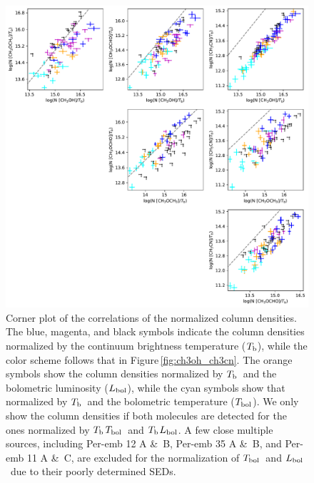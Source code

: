 \documentclass[twocolumn]{aastex62}
\newcommand{\lbol}{\mbox{$L_{\rm bol}$}}
\newcommand{\tbol}{\mbox{$T_{\rm bol}$}}
\newcommand{\tb}{\mbox{$T_{\rm b}$}}
\begin{document}
\begin{figure}[htbp!]
  \centering
  \includegraphics[width=\textwidth]{corner_Ncol_correlations_combined_norm.pdf}
  \caption{Corner plot of the correlations of the normalized column densities.  The blue, magenta, and black symbols indicate the column densities normalized by the continuum brightness temperature (\tb), while the color scheme follows that in Figure\,\ref{fig:ch3oh_ch3cn}.  The orange symbols show the column densities normalized by \tb\ and the bolometric luminosity ($\lbol$), while the cyan symbols show that normalized by \tb\ and the bolometric temperature (\tbol).  We only show the column densities if both molecules are detected for the ones normalized by \tb\tbol\ and \tb\lbol.  A few close multiple sources, including Per-emb 12 A \&\ B, Per-emb 35 A \&\ B, and Per-emb 11 A \&\ C, are excluded for the normalization of \tbol\ and \lbol\ due to their poorly determined SEDs.}
  \label{fig:corner_combined}
\end{figure}
\end{document}
